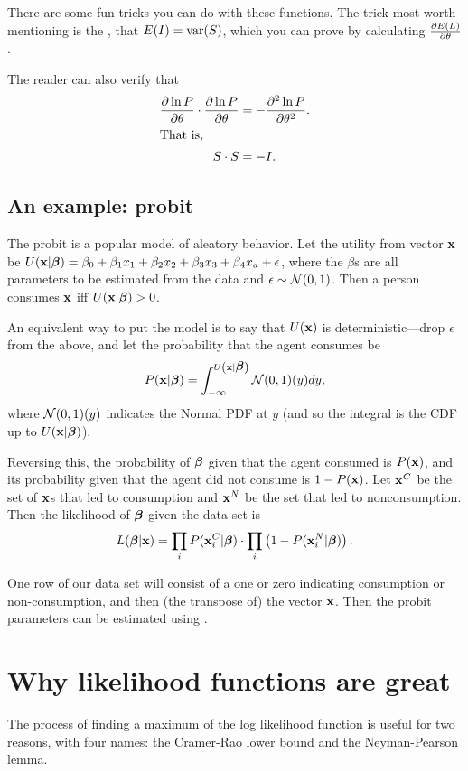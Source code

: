 There are some fun tricks you can do with these functions.
The trick most worth mentioning is the
, that $E(I)=\operatorname{var}(S)$, which you can prove by
calculating ${\partial E(L)\over \partial \theta}$.

The reader can also verify that 
\begin{align}
\frac{\partial \ln P}{\partial \theta}\cdot \frac{\partial \ln P}{\partial \theta} &= -\frac{\partial^2 \ln P}{\partial \theta^2}.\nonumber\\
\intertext{That is,}
S\cdot S &= -I.\nonumber
\end{align}


\subsection{An example: probit} 
The probit is a popular model of aleatory behavior. 
Let the utility from vector ${\bf x}$ be 
$U({\bf x}|{\mbox{\boldmath$\beta$}}) = \beta_0 + \beta_1 x_1 + \beta_2 x_2 + \beta_3 x_3 + \beta_4 x_a + \epsilon$,
where the $\beta$s are all parameters to be estimated from
the data and $\epsilon \sim {\cal N}(0,1)$.
Then a person consumes ${\bf x}$ iff $U({\bf x}|{\mbox{\boldmath$\beta$}})>0$. 

An equivalent way to put the model is to say that $U({\bf x})$ is
deterministic---drop $\epsilon$ from the above, and let the probability that
the agent consumes be
$$P({\bf x}|{\mbox{\boldmath$\beta$}}) = \int_{-\infty}^{U\left({\bf x}|{\mbox{\boldmath$\beta$}}\right)} {\cal N}(0,1)(y) dy,$$
where ${\cal N}(0,1)(y)$ indicates the Normal PDF at $y$ (and so the
integral is the CDF up to $U({\bf x}|{\mbox{\boldmath$\beta$}})$).

Reversing this, the probability of ${\mbox{\boldmath$\beta$}}$ given that the agent
consumed is $P({\bf x})$, and its probability given that the agent did not
consume is $1-P({\bf x})$. Let ${\bf x}^C$ be the set of ${\bf x}$s that led to
consumption and ${\bf x}^N$ be the set that led to nonconsumption. Then the
likelihood of ${\mbox{\boldmath$\beta$}}$ given the data set is 
$$L({\mbox{\boldmath$\beta$}}|{\bf x}) = \prod_{i} P({\bf x}^C_i|{\mbox{\boldmath$\beta$}}) \cdot \prod_{i} \left(1-P({\bf x}^N_i|{\mbox{\boldmath$\beta$}})\right).$$ 

One row of our data set will consist of a one or zero indicating
consumption or non-consumption, and then (the transpose of) the vector
${\bf x}$. Then the probit parameters can be estimated using
.

\section{Why likelihood functions are great} The process of finding a
maximum of the log likelihood function is 
useful for two reasons, with four names: the Cramer-Rao lower bound and
the Neyman-Pearson lemma.

